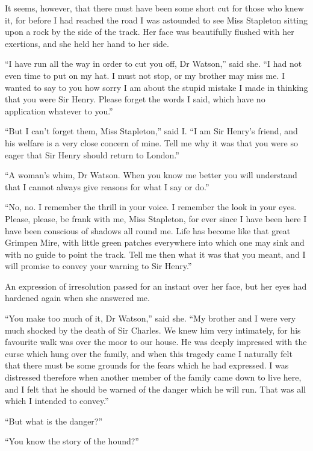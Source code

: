 \documentclass[paper=5.5in:8.5in,BCOR=7mm,twoside,DIV=calc,12pt,usegeometry,openany,chapterprefix,endperiod]{scrbook} %
\begin{document}
It seems, however, that there must have been some short cut for those who knew it, for before I had reached the road I was astounded to see Miss Stapleton sitting upon a rock by the side of the track. Her face was beautifully flushed with her exertions, and she held her hand to her side.

\enquote{I have run all the way in order to cut you off, Dr Watson,} said she. \enquote{I had not even time to put on my hat. I must not stop, or my brother may miss me. I wanted to say to you how sorry I am about the stupid mistake I made in thinking that you were Sir Henry. Please forget the words I said, which have no application whatever to you.}

\enquote{But I can't forget them, Miss Stapleton,} said I. \enquote{I am Sir Henry's friend, and his welfare is a very close concern of mine. Tell me why it was that you were so eager that Sir Henry should return to London.}

\enquote{A woman's whim, Dr Watson. When you know me better you will understand that I cannot always give reasons for what I say or do.}

\enquote{No, no. I remember the thrill in your voice. I remember the look in your eyes. Please, please, be frank with me, Miss Stapleton, for ever since I have been here I have been conscious of shadows all round me. Life has become like that great Grimpen Mire, with little green patches everywhere into which one may sink and with no guide to point the track. Tell me then what it was that you meant, and I will promise to convey your warning to Sir Henry.}

An expression of irresolution passed for an instant over her face, but her eyes had hardened again when she answered me.

\enquote{You make too much of it, Dr Watson,} said she. \enquote{My brother and I were very much shocked by the death of Sir Charles. We knew him very intimately, for his favourite walk was over the moor to our house. He was deeply impressed with the curse which hung over the family, and when this tragedy came I naturally felt that there must be some grounds for the fears which he had expressed. I was distressed therefore when another member of the family came down to live here, and I felt that he should be warned of the danger which he will run. That was all which I intended to convey.}

\enquote{But what is the danger?}

\enquote{You know the story of the hound?}
\end{document}

